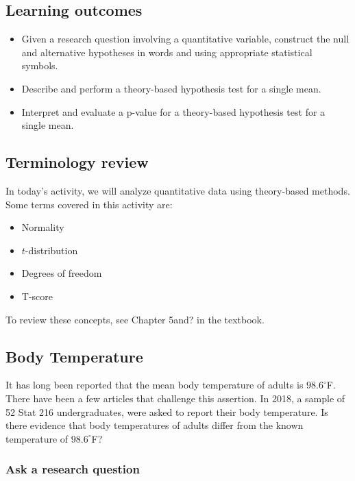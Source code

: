 \documentclass[
]{report}
\begin{document}

\subsection{Learning outcomes}\label{learning-outcomes-13}

\begin{itemize}
\item
  Given a research question involving a quantitative variable, construct the null and alternative hypotheses
  in words and using appropriate statistical symbols.
\item
  Describe and perform a theory-based hypothesis test for a single mean.
\item
  Interpret and evaluate a p-value for a theory-based hypothesis test for a single mean.
\end{itemize}

\subsection{Terminology review}\label{terminology-review-11}

In today's activity, we will analyze quantitative data using theory-based methods. Some terms covered in this activity are:

\begin{itemize}
\item
  Normality
\item
  \(t\)-distribution
\item
  Degrees of freedom
\item
  T-score
\end{itemize}

To review these concepts, see Chapter 5and? in the textbook.

\subsection{Body Temperature}\label{body-temperature}

It has long been reported that the mean body temperature of adults is \(98.6^{\circ}\)F. There have been a few articles that challenge this assertion. In 2018, a sample of 52 Stat 216 undergraduates, were asked to report their body temperature. Is there evidence that body temperatures of adults differ from the known temperature of \(98.6^{\circ}\)F?

\subsubsection*{Ask a research question}\label{ask-a-research-question-2}
\end{document}

